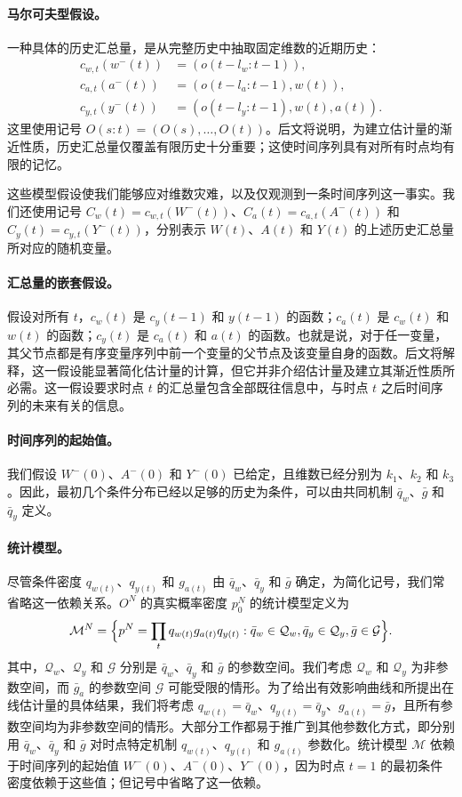\paragraph{马尔可夫型假设。}
一种具体的历史汇总量，是从完整历史中抽取固定维数的近期历史：
\[
\begin{aligned}
 c_{w,t}(w^-(t))&=(o(t-l_w:t-1)),\\
 c_{a,t}(a^-(t))&=(o(t-l_a:t-1),w(t)),\\
 c_{y,t}(y^-(t))&=(o(t-l_y:t-1),w(t),a(t)).
\end{aligned}
\]
这里使用记号 $O(s:t)=(O(s),\ldots,O(t))$。后文将说明，为建立估计量的渐近性质，历史汇总量仅覆盖有限历史十分重要；这使时间序列具有对所有时点均有限的记忆。

这些模型假设使我们能够应对维数灾难，以及仅观测到一条时间序列这一事实。我们还使用记号 $C_w(t)=c_{w,t}(W^-(t))$、$C_a(t)=c_{a,t}(A^-(t))$ 和 $C_y(t)=c_{y,t}(Y^-(t))$，分别表示 $W(t)$、$A(t)$ 和 $Y(t)$ 的上述历史汇总量所对应的随机变量。

\paragraph{汇总量的嵌套假设。}
假设对所有 $t$，$c_w(t)$ 是 $c_y(t-1)$ 和 $y(t-1)$ 的函数；$c_a(t)$ 是 $c_w(t)$ 和 $w(t)$ 的函数；$c_y(t)$ 是 $c_a(t)$ 和 $a(t)$ 的函数。也就是说，对于任一变量，其父节点都是有序变量序列中前一个变量的父节点及该变量自身的函数。后文将解释，这一假设能显著简化估计量的计算，但它并非介绍估计量及建立其渐近性质所必需。这一假设要求时点 $t$ 的汇总量包含全部既往信息中，与时点 $t$ 之后时间序列的未来有关的信息。

\paragraph{时间序列的起始值。}
我们假设 $W^-(0)$、$A^-(0)$ 和 $Y^-(0)$ 已给定，且维数已经分别为 $k_1$、$k_2$ 和 $k_3$。因此，最初几个条件分布已经以足够的历史为条件，可以由共同机制 $\bar q_w$、$\bar g$ 和 $\bar q_y$ 定义。

\paragraph{统计模型。}
尽管条件密度 $q_{w(t)}$、$q_{y(t)}$ 和 $g_{a(t)}$ 由 $\bar q_w$、$\bar q_y$ 和 $\bar g$ 确定，为简化记号，我们常省略这一依赖关系。$O^N$ 的真实概率密度 $p_0^N$ 的统计模型定义为
\[
 \mathcal M^N=\Bigl\{p^N=\prod_t q_{w(t)}g_{a(t)}q_{y(t)}:
 \bar q_w\in\mathcal Q_w,\bar q_y\in\mathcal Q_y,\bar g\in\mathcal G\Bigr\}.
\]
其中，$\mathcal Q_w$、$\mathcal Q_y$ 和 $\mathcal G$ 分别是 $\bar q_w$、$\bar q_y$ 和 $\bar g$ 的参数空间。我们考虑 $\mathcal Q_w$ 和 $\mathcal Q_y$ 为非参数空间，而 $\bar g_a$ 的参数空间 $\mathcal G$ 可能受限的情形。为了给出有效影响曲线和所提出在线估计量的具体结果，我们将考虑 $q_{w(t)}=\bar q_w$、$q_{y(t)}=\bar q_y$、$g_{a(t)}=\bar g$，且所有参数空间均为非参数空间的情形。大部分工作都易于推广到其他参数化方式，即分别用 $\bar q_w$、$\bar q_y$ 和 $\bar g$ 对时点特定机制 $q_{w(t)}$、$q_{y(t)}$ 和 $g_{a(t)}$ 参数化。统计模型 $\mathcal M$ 依赖于时间序列的起始值 $W^-(0)$、$A^-(0)$、$Y^-(0)$，因为时点 $t=1$ 的最初条件密度依赖于这些值；但记号中省略了这一依赖。

